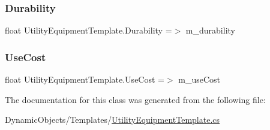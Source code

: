 \subsubsection{\texorpdfstring{Durability}{Durability}}
{\footnotesize\ttfamily float Utility\+Equipment\+Template.\+Durability =$>$ m\+\_\+durability}

\mbox{\label{class_utility_equipment_template_af7b4e3009b9d0ae093bfdc62b04d45ea}} 
\subsubsection{\texorpdfstring{Use\+Cost}{UseCost}}
{\footnotesize\ttfamily float Utility\+Equipment\+Template.\+Use\+Cost =$>$ m\+\_\+use\+Cost}



The documentation for this class was generated from the following file\+:\begin{DoxyCompactItemize}
\item 
Dynamic\+Objects/\+Templates/\mbox{\hyperlink{_utility_equipment_template_8cs}{Utility\+Equipment\+Template.\+cs}}\end{DoxyCompactItemize}
